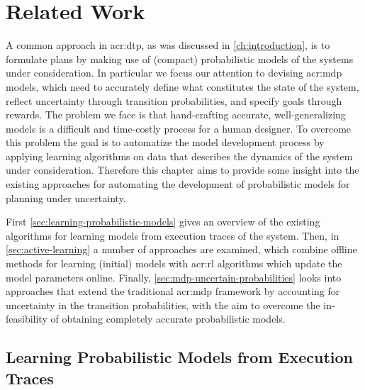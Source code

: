 \chapter{Related Work}
\label{ch:problem-related-work}

A common approach in \acrshort{acr:dtp}, as was discussed in \autoref{ch:introduction}, is to formulate plans by making use of (compact) probabilistic models of the systems under consideration.
In particular we focus our attention to devising \acrshort{acr:mdp} models, which need to accurately define what constitutes the state of the system, reflect uncertainty through transition probabilities, and specify goals through rewards.
The problem we face is that hand-crafting accurate, well-generalizing models is a difficult and time-costly process for a human designer.
To overcome this problem the goal is to automatize the model development process by applying learning algorithms on data that describes the dynamics of the system under consideration.
Therefore this chapter aims to provide some insight into the existing approaches for automating the development of probabilistic models for planning under uncertainty.

First \autoref{sec:learning-probabilistic-models} gives an overview of the existing algorithms for learning models from execution traces of the system.
Then, in \autoref{sec:active-learning} a number of approaches are examined, which combine offline methods for learning (initial) models with \acrshort{acr:rl} algorithms which update the model parameters online.
Finally, \autoref{sec:mdp-uncertain-probabilities} looks into approaches that extend the traditional \acrshort{acr:mdp} framework by accounting for uncertainty in the transition probabilities, with the aim to overcome the in-feasibility of obtaining completely accurate probabilistic models.

%

\section{Learning Probabilistic Models from Execution Traces}
\label{sec:learning-probabilistic-models}

